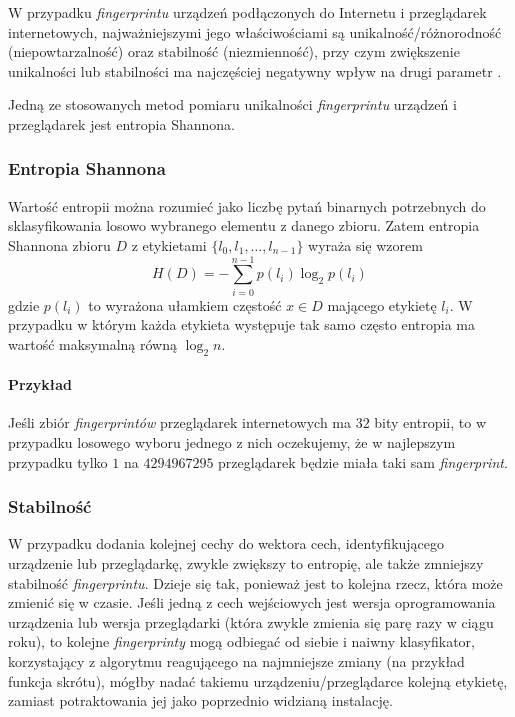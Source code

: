 W przypadku \emph{fingerprintu} urządzeń podłączonych do Internetu i
przeglądarek internetowych, najważniejszymi jego właściwościami są
unikalność/różnorodność (niepowtarzalność) oraz stabilność (niezmienność), przy
czym zwiększenie unikalności lub stabilności ma najczęściej negatywny wpływ na
drugi parametr \cite[s. 11]{eckersley2010unique}.

Jedną ze stosowanych \cite[s. 6]{eckersley2010unique} metod pomiaru unikalności
\emph{fingerprintu} urządzeń i przeglądarek jest entropia Shannona.

\subsubsection{Entropia Shannona}
Wartość entropii można rozumieć jako liczbę pytań binarnych potrzebnych do
sklasyfikowania losowo wybranego elementu z danego zbioru. Zatem entropia
Shannona zbioru \(D\) z etykietami \(\{l_{0}, l_{1}, \dots, l_{n - 1}\}\) wyraża
się wzorem \[H(D) = -{\sum_{i = 0}^{n - 1}{p(l_{i})\log_{2}{p(l_{i})}}}\] gdzie
\(p(l_{i})\) to wyrażona ułamkiem częstość \(x \in D\) mającego etykietę
\(l_{i}\). W przypadku w którym każda etykieta występuje tak samo często
entropia ma wartość maksymalną równą \(\log_{2}{n}\).

\paragraph{Przykład}
Jeśli zbiór \emph{fingerprintów} przeglądarek internetowych ma \(32\) bity
entropii, to w przypadku losowego wyboru jednego z nich oczekujemy, że w
najlepszym przypadku tylko \(1\) na \(4294967295\) przeglądarek będzie miała
taki sam \emph{fingerprint}.

\subsubsection{Stabilność}
W przypadku dodania kolejnej cechy do wektora cech, identyfikującego urządzenie
lub przeglądarkę, zwykle zwiększy to entropię, ale także zmniejszy stabilność
\emph{fingerprintu}. Dzieje się tak, ponieważ jest to kolejna rzecz, która może
zmienić się w czasie. Jeśli jedną z cech wejściowych jest wersja oprogramowania
urządzenia lub wersja przeglądarki (która zwykle zmienia się parę razy w ciągu
roku), to kolejne \emph{fingerprinty} mogą odbiegać od siebie i naiwny
klasyfikator, korzystający z algorytmu reagującego na najmniejsze zmiany (na
przykład funkcja skrótu), mógłby nadać takiemu urządzeniu/przeglądarce kolejną
etykietę, zamiast potraktowania jej jako poprzednio widzianą instalację.

